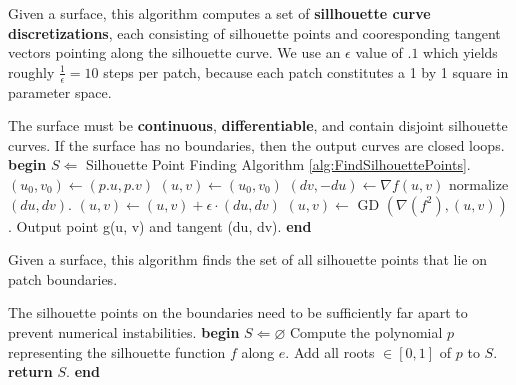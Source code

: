 \documentclass[12pt, letterpaper]{article}
\let\emptyset\varnothing
\begin{document}
			\begin{algorithm}                      %
			\caption{Given a surface, this algorithm computes a set of \textbf{sillhouette curve discretizations},
				each consisting of silhouette points and cooresponding tangent vectors pointing along the silhouette curve.
				We use an $\epsilon$ value of $.1$ which yields roughly $\frac{1}{\epsilon} = 10$ steps per patch, because each patch constitutes a 1 by 1 square in parameter space.} %
			\label{alg:TraceSilhouettes}       %
			\begin{algorithmic}                    %
			    \REQUIRE The surface must be \textbf{continuous}, \textbf{differentiable}, and contain disjoint silhouette curves.
			    \ENSURE  If the surface has no boundaries, then the output curves are closed loops.
				\STATE \textbf{begin}
			    \STATE $S \Leftarrow $ Silhouette Point Finding Algorithm \ref{alg:FindSilhouettePoints}.
			        \STATE $(u_{0}, v_{0}) \leftarrow (p.u, p.v)$
				\STATE $(u, v) \leftarrow (u_{0}, v_{0})$
				\REPEAT
				        \STATE $(dv, -du) \leftarrow \nabla f(u,v)$
					\STATE normalize $(du, dv)$.
					\STATE $(u, v) \leftarrow (u, v) + \epsilon \cdot (du, dv)$
					\STATE $(u, v) \leftarrow $ GD $(\nabla(f^{2}),(u,v))$.
					\STATE Output point g(u, v) and tangent (du, dv).
			   \ENDFOR
				\STATE \textbf{end}
			\end{algorithmic}
			\end{algorithm}

			\begin{algorithm}                      %
			\caption{Given a surface, this algorithm finds the set of all silhouette points that lie on patch boundaries.} %
			\label{alg:FindSilhouettePoints}  %
			\begin{algorithmic}                    %
			 	\REQUIRE The silhouette points on the boundaries need to be sufficiently far apart to prevent numerical instabilities.
				\ENSURE  
				\STATE \textbf{begin}
				\STATE $S \Leftarrow \emptyset$
					\STATE Compute the polynomial $p$ representing the silhouette function $f$ along $e$.
					\STATE Add all roots $\in [0, 1]$ of $p$ to $S$.
				\ENDFOR
			 	\STATE \textbf{return} $S$.
				\STATE \textbf{end}
			\end{algorithmic}
			\end{algorithm}
\end{document}
